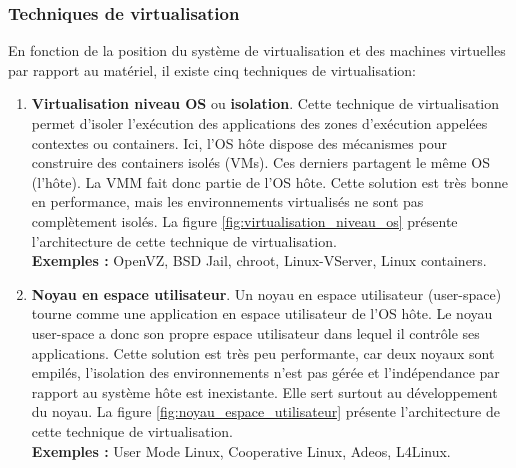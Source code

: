 \subsubsection{Techniques de virtualisation}
En fonction de la position du système de virtualisation et des machines virtuelles par rapport au matériel, il existe cinq techniques de virtualisation:
\begin{enumerate}[label=\textbf{(\roman*)}]
    \item \textbf{Virtualisation niveau OS} ou \textbf{isolation}. Cette technique de virtualisation permet d'isoler l'exécution des applications des zones d'exécution appelées contextes ou containers. Ici, l'\acs{OS} hôte dispose des mécanismes pour construire des containers isolés (VMs). Ces derniers partagent le même OS (l'hôte). La \acs{VMM} fait donc partie de l'OS hôte. Cette solution est très bonne en performance, mais les environnements virtualisés ne sont pas complètement isolés. La figure \ref{fig:virtualisation_niveau_os} présente l'architecture de cette technique de virtualisation.
    \\ \textbf{Exemples :} OpenVZ,  BSD Jail, chroot, Linux-VServer, Linux containers.
    
    \item \textbf{Noyau en espace utilisateur}. Un noyau en espace utilisateur (user-space) tourne comme une application en espace utilisateur de l'OS hôte. Le noyau user-space a donc son propre espace utilisateur dans lequel il contrôle ses applications. Cette solution est très peu performante, car deux noyaux sont empilés, l’isolation des environnements n’est pas gérée et l’indépendance par rapport au système hôte est inexistante. Elle sert surtout au développement du noyau. La figure \ref{fig:noyau_espace_utilisateur} présente l'architecture de cette technique de virtualisation.
    \\ \textbf{Exemples :} User Mode Linux, Cooperative Linux, Adeos, L4Linux.
    

\end{enumerate}
